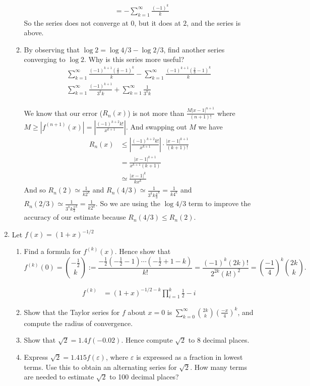 \documentclass[letterpaper]{article}
\begin{document}
\begin{enumerate}
\begin{enumerate}
\begin{align*}
    &=-\sum\limits_{k=1}^\infty{\frac{(-1)^k}{k}}
  \end{align*}
  So the series does not converge at $0$, but it does at $2$, and the series is above.
  \item
  By observing that $\log 2=\log 4/3-\log 2/3$, find another series converging to $\log 2$. Why is this series more useful?
  \begin{align*}
    \sum\limits_{k=1}^\infty{\frac{(-1)^{k+1}(\frac{4}{3}-1)^k}{k}}
    -\sum\limits_{k=1}^\infty{\frac{(-1)^{k+1}(\frac{2}{3}-1)^k}{k}}\\
    \sum\limits_{k=1}^\infty{\frac{(-1)^{k+1}}{3^kk}}
    +\sum\limits_{k=1}^\infty{\frac{1}{3^kk}}\\
  \end{align*}

  We know that our error ($R_n(x)$) is not more than
  $\frac{M|x-1|^{n+1}}{(n+1)!}$
  where $M\ge |f^{(n+1)}(x)|=\left\lvert\frac{(-1)^{k+2}k!}{x^{k+1}}\right\rvert$. And swapping out $M$ we have
  \begin{align*}
    R_n(x)
    &\le \left\lvert\frac{(-1)^{k+2}k!}{x^{k+1}}\right\rvert\cdot\frac{|x-1|^{k+1}}{(k+1)!}\\
    &= \frac{|x-1|^{k+1}}{x^{k+1}(k+1)}\\
    &\simeq \frac{|x-1|^{k}}{kx^{k}}
  \end{align*}
  And so $R_n(2)\simeq\frac{1}{k2^k}$ and $R_n(4/3)\simeq\frac{1}{3^kk\frac{4}{3}^k}=\frac{1}{k4^k}$ and $R_n(2/3)\simeq\frac{1}{3^kk\frac{2}{3}^k}=\frac{1}{k2^k}$. So we are using the $\log 4/3$ term to improve the accuracy of our estimate because $R_n(4/3)\le R_n(2)$.
  \end{enumerate}
\setcounter{enumi}{8}
\item
Let $f(x)=(1+x)^{-1/2}$
  \begin{enumerate}
  \item
  Find a formula for $f^{(k)}(x)$. Hence show that
  \[f^{(k)}(0)={-\frac{1}{2} \choose k}:=\frac{-\frac{1}{2}(-\frac{1}{2}-1)\cdots(-\frac{1}{2}+1-k)}{k!}=\frac{(-1)^k(2k)!}{2^{2k}(k!)^2}=\left(\frac{-1}{4}\right)^k{2k\choose k}.\]

  \begin{align*}
    f^{(k)}&=(1+x)^{-1/2-k}\prod\limits_{i=1}^k{\frac{1}{2}-i}
  \end{align*}
  \item
  Show that the Taylor series for $f$ about $x=0$ is $\sum\limits_{k=0}^\infty{{2k\choose k}\left(\frac{-x}{4}\right)^k}$, and compute the radius of convergence.
  \item
  Show that $\sqrt{2}=1.4f(-0.02)$.
  Hence compute $\sqrt{2}$ to $8$ decimal places.
  \item
  Express $\sqrt{2}=1.415f(\varepsilon)$, where $\varepsilon$ is expressed as a fraction in lowest terms. Use this to obtain an alternating series for $\sqrt{2}$. How many terms are needed to estimate $\sqrt{2}$ to 100 decimal places?
  \end{enumerate}
\end{enumerate}
\end{document}
